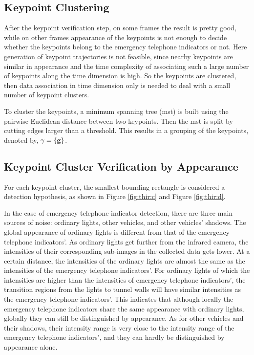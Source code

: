 \subsection{Keypoint Clustering}

After the keypoint verification step, on some frames the result is pretty good, while on other frames appearance of the keypoints is not enough to decide whether the keypoints belong to the emergency telephone indicators or not. Here generation of keypoint trajectories is not feasible, since nearby keypoints are similar in appearance and  the time complexity of associating such a large number of keypoints along the time dimension is high. So the keypoints are clustered, then data association in time dimension only is needed to deal with a small number of keypoint clusters.

To cluster the keypoints, a minimum spanning tree (mst) is built using the pairwise Euclidean distance between two keypoints. Then the mst is split by cutting edges larger than a threshold. This results in a grouping  of the keypoints, denoted by, $\gamma=\{\bf{g}\}$.



\subsection{Keypoint Cluster Verification by Appearance}


For each keypoint cluster, the smallest bounding rectangle is considered a detection hypothesis, as shown in Figure \ref{fig:thir:c} and Figure \ref{fig:thir:d}. 

In the case of emergency telephone indicator detection, there are three main sources of noise: ordinary lights, other vehicles, and other vehicles' shadows. The global appearance of ordinary lights is different from that of the emergency telephone indicators'. As ordinary lights get further from the infrared camera, the intensities of their corresponding sub-images in the collected data gets lower. At a certain distance, the intensities of the ordinary lights are almost the same as the intensities of the emergency telephone indicators'. For ordinary lights of which the intensities are higher than the intensities of emergency telephone indicators', the transition regions from the lights to tunnel walls will have similar intensities as the emergency telephone indicators'.
This indicates that although locally the emergency telephone indicators share the same appearance with ordinary lights, globally they can still be distinguished by appearance. As for other vehicles and their shadows, their intensity range is very close to the intensity range of the emergency telephone indicators', and they can hardly be distinguished by appearance alone.

